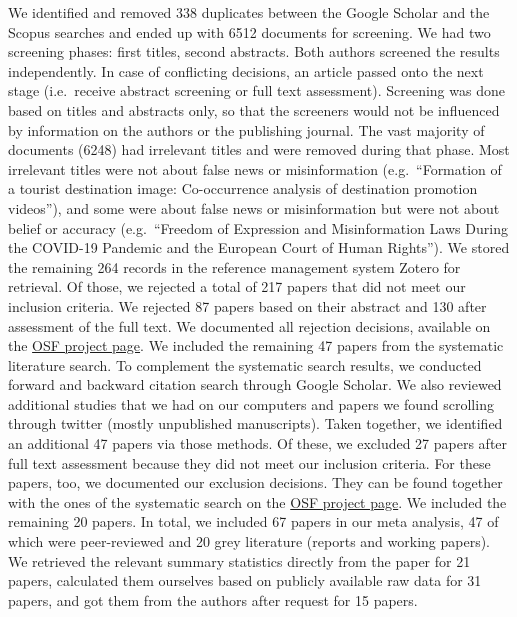 \documentclass[
  doc,floatsintext]{apa6}
\begin{document}
We identified and removed 338 duplicates between the Google Scholar and the Scopus searches and ended up with 6512 documents for screening. We had two screening phases: first titles, second abstracts. Both authors screened the results independently. In case of conflicting decisions, an article passed onto the next stage (i.e.~receive abstract screening or full text assessment). Screening was done based on titles and abstracts only, so that the screeners would not be influenced by information on the authors or the publishing journal. The vast majority of documents (6248) had irrelevant titles and were removed during that phase. Most irrelevant titles were not about false news or misinformation (e.g.~``Formation of a tourist destination image: Co-occurrence analysis of destination promotion videos''), and some were about false news or misinformation but were not about belief or accuracy (e.g.~``Freedom of Expression and Misinformation Laws During the COVID-19 Pandemic and the European Court of Human Rights''). We stored the remaining 264 records in the reference management system Zotero for retrieval. Of those, we rejected a total of 217 papers that did not meet our inclusion criteria. We rejected 87 papers based on their abstract and 130 after assessment of the full text. We documented all rejection decisions, available on the \href{https://osf.io/96zbp/?view_only=d2f3147f652e44e2a0414d7d6d9a6c29}{OSF project page}. We included the remaining 47 papers from the systematic literature search. To complement the systematic search results, we conducted forward and backward citation search through Google Scholar. We also reviewed additional studies that we had on our computers and papers we found scrolling through twitter (mostly unpublished manuscripts). Taken together, we identified an additional 47 papers via those methods. Of these, we excluded 27 papers after full text assessment because they did not meet our inclusion criteria. For these papers, too, we documented our exclusion decisions. They can be found together with the ones of the systematic search on the \href{https://osf.io/96zbp/?view_only=d2f3147f652e44e2a0414d7d6d9a6c29}{OSF project page}. We included the remaining 20 papers. In total, we included 67 papers in our meta analysis, 47 of which were peer-reviewed and 20 grey literature (reports and working papers). We retrieved the relevant summary statistics directly from the paper for 21 papers, calculated them ourselves based on publicly available raw data for 31 papers, and got them from the authors after request for 15 papers.
\end{document}
